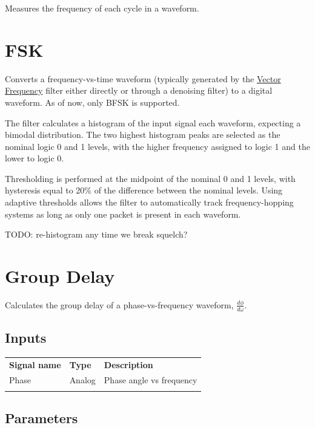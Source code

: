 Measures the frequency of each cycle in a waveform.

\pagebreak
\section{FSK}

Converts a frequency-vs-time waveform (typically generated by the \hyperref[filter:vector_frequency]{Vector Frequency}
filter either directly or through a denoising filter) to a digital waveform. As of now, only BFSK is supported.

The filter calculates a histogram of the input signal each waveform, expecting a bimodal distribution. The two highest
histogram peaks are selected as the nominal logic 0 and 1 levels, with the higher frequency assigned to logic 1 and the
lower to logic 0.

Thresholding is performed at the midpoint of the nominal 0 and 1 levels, with hysteresis equal to 20\% of the
difference between the nominal levels. Using adaptive thresholds allows the filter to automatically track
frequency-hopping systems as long as only one packet is present in each waveform.

TODO: re-histogram any time we break squelch?

\pagebreak
\section{Group Delay}
\label{filter:groupdelay}

Calculates the group delay of a phase-vs-frequency waveform, $\frac{d\phi}{d\omega}$.

\subsection{Inputs}

\begin{tabularx}{16cm}{llX}
\thickhline
\textbf{Signal name} & \textbf{Type} & \textbf{Description} \\
\thickhline
Phase & Analog & Phase angle vs frequency\\
\thickhline
\end{tabularx}

\subsection{Parameters}

